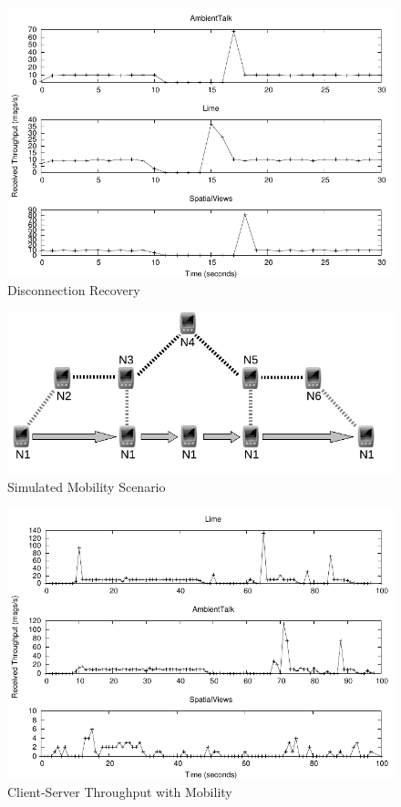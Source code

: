 \begin{figure}
\includegraphics[scale = .70]{figures/disconnection.pdf}
\caption{Disconnection Recovery}
\label{fig:disconnection}
\end{figure}

\begin{figure}
\includegraphics[scale = .70]{figures/network.pdf}
\caption{Simulated Mobility Scenario}
\label{fig:network}
\end{figure}

\begin{figure}
\includegraphics[scale = .70]{figures/mobility-results.pdf}
\caption{Client-Server Throughput with Mobility}
\label{fig:mobility-results}
\end{figure}

